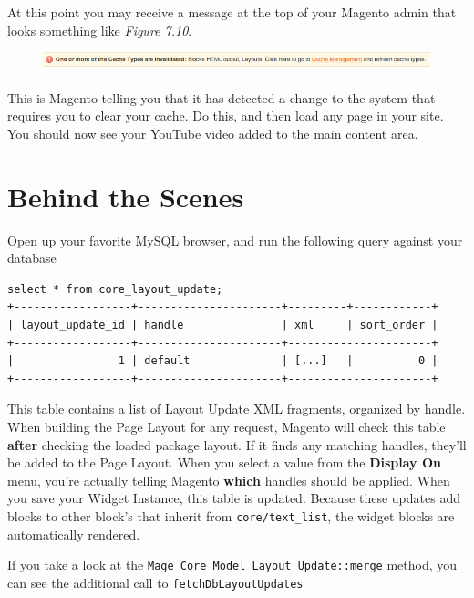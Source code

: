 \documentclass[oneside]{book}
\begin{document}
At this point you may receive a message at the top of your Magento admin that looks something like \emph{Figure 7.10}.

\begin{figure}[htb]
\begin{center}
\leavevmode
\includegraphics[width=1\textwidth]{images/chapter7/invalidated.png}
\end{center}
\caption{}
\end{figure}


This is Magento telling you that it has detected a change to the system that requires you to clear your cache.  Do this, and then load any page in your site.  You should now see your YouTube video added to the main content area.    

\section{Behind the Scenes}

Open up your favorite MySQL browser, and run the following query against your database

\begin{lstlisting}
select * from core_layout_update;  
+------------------+----------------------+---------+------------+
| layout_update_id | handle               | xml     | sort_order |
+------------------+----------------------+----------------------+
|                1 | default              | [...]   |          0 |
+------------------+----------------------+----------------------+

\end{lstlisting}


This table contains a list of Layout Update XML fragments, organized by handle.  When building the Page Layout for any request, Magento will check this table \textbf{after} checking the loaded package layout.  If it finds any matching handles, they'll be added to the Page Layout.  When you select a value from the \textbf{Display On} menu, you're actually telling Magento \textbf{which} handles should be applied.  When you save your Widget Instance, this table is updated.  Because these updates add blocks to other block's that inherit from \footnotesize\texttt{core/text\_list}\normalsize, the widget blocks are automatically rendered. 

If you take a look at the \footnotesize\texttt{Mage\_Core\_Model\_Layout\_Update::merge} \normalsize  method, you can see the additional call to \footnotesize\texttt{fetchDbLayoutUpdates} \normalsize 
\end{document}
